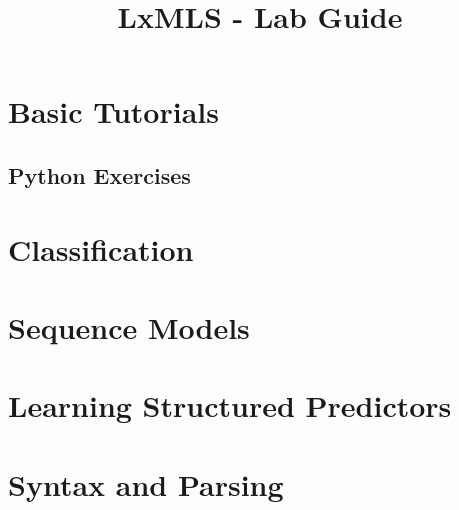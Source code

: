 \documentclass{report}
\begin{document}
\title{LxMLS - Lab Guide}

\maketitle

\renewcommand{\chaptername}{Day}
\setcounter{chapter}{-1}

\chapter{Basic Tutorials}



%

\section{Python Exercises}







\chapter{\label{day:classification}Classification}



\chapter{\label{day:seq}Sequence Models}


\chapter{\label{day:seq_disc}Learning Structured Predictors}


\chapter{Syntax and Parsing}

\end{document}
